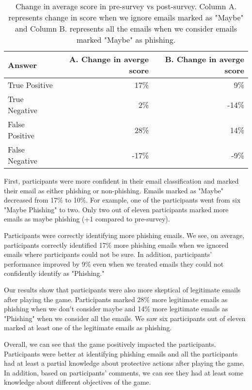 \begin{table}[!ht]
    \centering
    \begin{tabular}{l r r}
        \hline
        \textbf{Answer} & \textbf{A. Change in averge score} & \textbf{B. Change in averge score} \\
        \hline
        True Positive   & 17\%                               & 9\%                                \\
        True Negative   & 2\%                                & -14\%                              \\
        False Positive  & 28\%                               & 14\%                               \\
        False Negative  & -17\%                              & -9\%                               \\
        \hline
    \end{tabular}
    \caption[Change in average score in pre-survey vs post-survey]{Change in average score in pre-survey vs post-survey. Column A. represents change in score when we ignore emails marked as "Maybe" and Column B. represents all the emails when we consider emails marked "Maybe" as phishing.}
    \label{tab:pre_vs_post}
\end{table}

First, participants were more confident in their email classification and marked their email as either phishing or non-phishing. Emails marked as "Maybe" decreased from 17\% to 10\%. For example, one of the participants went from six "Maybe Phishing" to two. Only two out of eleven participants marked more emails as maybe phishing (+1 compared to pre-survey).

Participants were correctly identifying more phishing emails. We see, on average, participants correctly identified 17\% more phishing emails when we ignored emails where participants could not be sure. In addition, participants' performance improved by 9\% even when we treated emails they could not confidently identify as "Phishing."

Our results show that participants were also more skeptical of legitimate emails after playing the game. Participants marked 28\% more legitimate emails as phishing when we don't consider maybe and 14\% more legitimate emails as "Phishing" when we consider all the emails. We saw six participants out of eleven marked at least one of the legitimate emails as phishing.

Overall, we can see that the game positively impacted the participants. Participants were better at identifying phishing emails and all the participants had at least a partial knowledge about protective actions after playing the game. In addition, based on participants' comments, we can see they had at least some knowledge about different objectives of the game.

